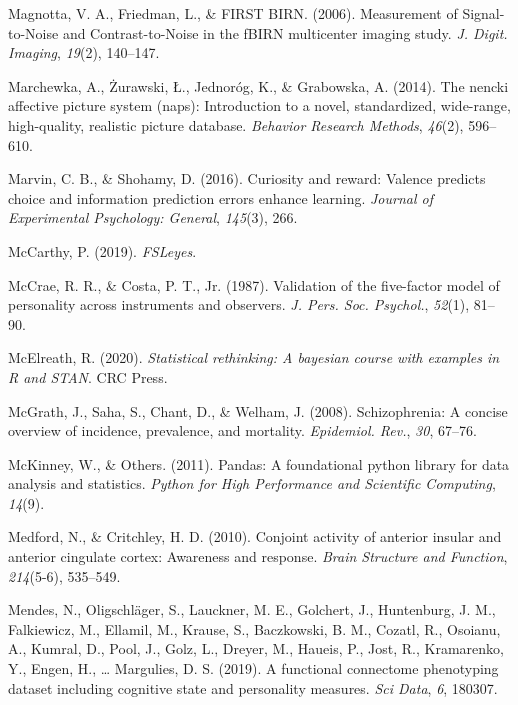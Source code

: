 \documentclass[11pt,american,]{memoir} %
\begin{document}
\leavevmode\hypertarget{ref-Magnotta2006-zs}{}%
Magnotta, V. A., Friedman, L., \& FIRST BIRN. (2006). Measurement of Signal-to-Noise and Contrast-to-Noise in the fBIRN multicenter imaging study. \emph{J. Digit. Imaging}, \emph{19}(2), 140--147.

\leavevmode\hypertarget{ref-marchewka2014nencki}{}%
Marchewka, A., Żurawski, Ł., Jednoróg, K., \& Grabowska, A. (2014). The nencki affective picture system (naps): Introduction to a novel, standardized, wide-range, high-quality, realistic picture database. \emph{Behavior Research Methods}, \emph{46}(2), 596--610.

\leavevmode\hypertarget{ref-marvin2016curiosity}{}%
Marvin, C. B., \& Shohamy, D. (2016). Curiosity and reward: Valence predicts choice and information prediction errors enhance learning. \emph{Journal of Experimental Psychology: General}, \emph{145}(3), 266.

\leavevmode\hypertarget{ref-McCarthy2019-yt}{}%
McCarthy, P. (2019). \emph{FSLeyes}.

\leavevmode\hypertarget{ref-McCrae1987-ww}{}%
McCrae, R. R., \& Costa, P. T., Jr. (1987). Validation of the five-factor model of personality across instruments and observers. \emph{J. Pers. Soc. Psychol.}, \emph{52}(1), 81--90.

\leavevmode\hypertarget{ref-McElreath2020-pz}{}%
McElreath, R. (2020). \emph{Statistical rethinking: A bayesian course with examples in R and STAN}. CRC Press.

\leavevmode\hypertarget{ref-McGrath2008-oj}{}%
McGrath, J., Saha, S., Chant, D., \& Welham, J. (2008). Schizophrenia: A concise overview of incidence, prevalence, and mortality. \emph{Epidemiol. Rev.}, \emph{30}, 67--76.

\leavevmode\hypertarget{ref-McKinney2011-kl}{}%
McKinney, W., \& Others. (2011). Pandas: A foundational python library for data analysis and statistics. \emph{Python for High Performance and Scientific Computing}, \emph{14}(9).

\leavevmode\hypertarget{ref-medford2010conjoint}{}%
Medford, N., \& Critchley, H. D. (2010). Conjoint activity of anterior insular and anterior cingulate cortex: Awareness and response. \emph{Brain Structure and Function}, \emph{214}(5-6), 535--549.

\leavevmode\hypertarget{ref-Mendes2019-yh}{}%
Mendes, N., Oligschläger, S., Lauckner, M. E., Golchert, J., Huntenburg, J. M., Falkiewicz, M., Ellamil, M., Krause, S., Baczkowski, B. M., Cozatl, R., Osoianu, A., Kumral, D., Pool, J., Golz, L., Dreyer, M., Haueis, P., Jost, R., Kramarenko, Y., Engen, H., \ldots{} Margulies, D. S. (2019). A functional connectome phenotyping dataset including cognitive state and personality measures. \emph{Sci Data}, \emph{6}, 180307.
\end{document}
